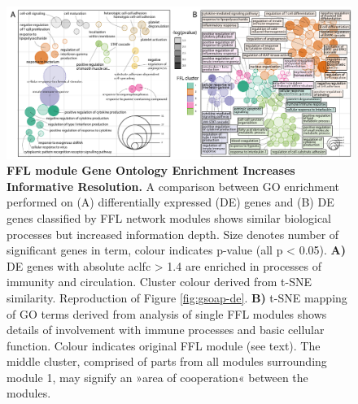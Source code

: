 \begin{figure}
\includegraphics[width=\textwidth]{figures/gsoap-ffl}
\caption[FFL module Gene Ontology Enrichment.]{\textbf{FFL module Gene Ontology Enrichment Increases Informative Resolution.} A comparison between GO enrichment performed on (A) differentially expressed (DE) genes and (B) DE genes classified by FFL network modules shows similar biological processes but increased information depth. Size denotes number of significant genes in term, colour indicates p-value (all p < 0.05). \textbf{A)} DE genes with absolute ac{lfc} > 1.4 are enriched in processes of immunity and circulation. Cluster colour derived from t-SNE similarity. Reproduction of Figure \ref{fig:gsoap-de}. \textbf{B)} t-SNE mapping of GO terms derived from analysis of single FFL modules shows details of involvement with immune processes and basic cellular function. Colour indicates original FFL module (see text). The middle cluster, comprised of parts from all modules surrounding module 1, may signify an »area of cooperation« between the modules.
\label{fig:gsoap-ffl}}
\end{figure}

